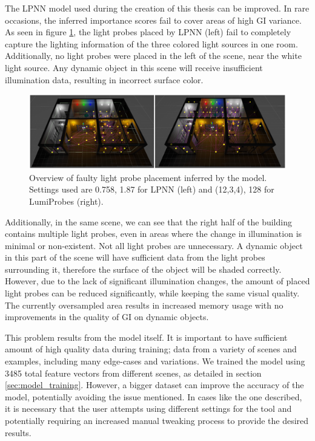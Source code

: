 The LPNN model used during the creation of this thesis can be improved. In rare occasions, the inferred importance scores fail to cover areas of high GI variance. As seen in figure \ref{fig:office_faulty}, the light probes placed by LPNN (left) fail to completely capture the lighting information of the three colored light sources in one room. Additionally, no light probes were placed in the left of the scene, near the white light source. Any dynamic object in this scene will receive insufficient illumination data, resulting in incorrect surface color.\newline

\begin{figure}[h]
	\centering
	\includegraphics[width=\linewidth]{Graphics/results/concats/comparison6.png}
	\caption{Overview of faulty light probe placement inferred by the model. Settings used are 0.758, 1.87 for LPNN (left) and (12,3,4), 128 for LumiProbes (right).}
	\label{fig:office_faulty}
\end{figure}

Additionally, in the same scene, we can see that the right half of the building contains multiple light probes, even in areas where the change in illumination is minimal or non-existent. Not all light probes are unnecessary. A dynamic object in this part of the scene will have sufficient data from the light probes surrounding it, therefore the surface of the object will be shaded correctly. However, due to the lack of significant illumination changes, the amount of placed light probes can be reduced significantly, while keeping the same visual quality. The currently oversampled area results in increased memory usage with no improvements in the quality of GI on dynamic objects.\newline

This problem results from the model itself. It is important to have sufficient amount of high quality data during training; data from a variety of scenes and examples, including many edge-cases and variations. We trained the model using 3485 total feature vectors from different scenes, as detailed in section \ref{sec:model_training}. However, a bigger dataset can improve the accuracy of the model, potentially avoiding the issue mentioned. In cases like the one described, it is necessary that the user attempts using different settings for the tool and potentially requiring an increased manual tweaking process to provide the desired results.

